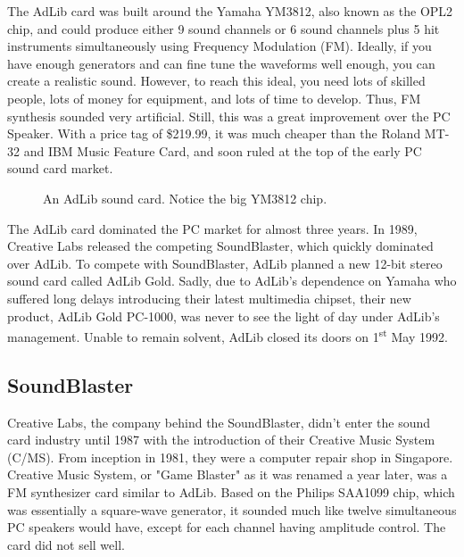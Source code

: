 \documentclass[book.tex]{subfiles}
\begin{document}
\par
The AdLib card was built around the Yamaha YM3812, also known as the OPL2 chip, and could produce either 9 sound channels or 6 sound channels plus 5 hit instruments simultaneously using Frequency Modulation (FM). Ideally, if you have enough generators and can fine tune the waveforms well enough, you can create a realistic sound. However, to reach this ideal, you need lots of skilled people, lots of money for equipment, and lots of time to develop. Thus, FM synthesis sounded very artificial. Still, this was a great improvement over the PC Speaker. With a price tag of \$219.99, it was much cheaper than the Roland MT-32 and IBM Music Feature Card, and soon ruled at the top of the early PC sound card market.\\

\par
  \begin{figure}[H] 
    \centering 
    \caption{An AdLib sound card. Notice the big YM3812 chip.}
  \end{figure}

\par
The AdLib card dominated the PC market for almost three years. In 1989, Creative Labs released the competing SoundBlaster, which quickly dominated over AdLib. To compete with SoundBlaster, AdLib planned a new 12-bit stereo sound card called AdLib Gold. Sadly, due to AdLib's dependence on Yamaha who suffered long delays introducing their latest multimedia chipset, their new product, AdLib Gold PC-1000, was never to see the light of day under AdLib's management. Unable to remain solvent, AdLib closed its doors on 1\textsuperscript{st} May 1992.\\





  \subsection{SoundBlaster}
  Creative Labs, the company behind the SoundBlaster, didn't enter the sound card industry until 1987 with the introduction of their Creative Music System (C/MS). From inception in 1981, they were a computer repair shop in Singapore. Creative Music System, or "Game Blaster" as it was renamed a year later, was a FM synthesizer card similar to AdLib. Based on the Philips SAA1099 chip, which was essentially a square-wave generator, it sounded much like twelve simultaneous PC speakers would have, except for each channel having amplitude control. The card did not sell well.\\
  
\end{document}

